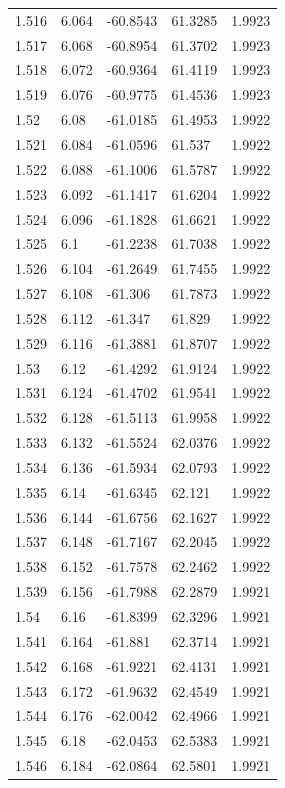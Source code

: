 \begin{tabular}{lllll}
1.516 & 6.064 & -60.8543 & 61.3285 & 1.9923 \\
1.517 & 6.068 & -60.8954 & 61.3702 & 1.9923 \\
1.518 & 6.072 & -60.9364 & 61.4119 & 1.9923 \\
1.519 & 6.076 & -60.9775 & 61.4536 & 1.9923 \\
1.52 & 6.08 & -61.0185 & 61.4953 & 1.9922 \\
1.521 & 6.084 & -61.0596 & 61.537 & 1.9922 \\
1.522 & 6.088 & -61.1006 & 61.5787 & 1.9922 \\
1.523 & 6.092 & -61.1417 & 61.6204 & 1.9922 \\
1.524 & 6.096 & -61.1828 & 61.6621 & 1.9922 \\
1.525 & 6.1 & -61.2238 & 61.7038 & 1.9922 \\
1.526 & 6.104 & -61.2649 & 61.7455 & 1.9922 \\
1.527 & 6.108 & -61.306 & 61.7873 & 1.9922 \\
1.528 & 6.112 & -61.347 & 61.829 & 1.9922 \\
1.529 & 6.116 & -61.3881 & 61.8707 & 1.9922 \\
1.53 & 6.12 & -61.4292 & 61.9124 & 1.9922 \\
1.531 & 6.124 & -61.4702 & 61.9541 & 1.9922 \\
1.532 & 6.128 & -61.5113 & 61.9958 & 1.9922 \\
1.533 & 6.132 & -61.5524 & 62.0376 & 1.9922 \\
1.534 & 6.136 & -61.5934 & 62.0793 & 1.9922 \\
1.535 & 6.14 & -61.6345 & 62.121 & 1.9922 \\
1.536 & 6.144 & -61.6756 & 62.1627 & 1.9922 \\
1.537 & 6.148 & -61.7167 & 62.2045 & 1.9922 \\
1.538 & 6.152 & -61.7578 & 62.2462 & 1.9922 \\
1.539 & 6.156 & -61.7988 & 62.2879 & 1.9921 \\
1.54 & 6.16 & -61.8399 & 62.3296 & 1.9921 \\
1.541 & 6.164 & -61.881 & 62.3714 & 1.9921 \\
1.542 & 6.168 & -61.9221 & 62.4131 & 1.9921 \\
1.543 & 6.172 & -61.9632 & 62.4549 & 1.9921 \\
1.544 & 6.176 & -62.0042 & 62.4966 & 1.9921 \\
1.545 & 6.18 & -62.0453 & 62.5383 & 1.9921 \\
1.546 & 6.184 & -62.0864 & 62.5801 & 1.9921 \\

\end{tabular}
